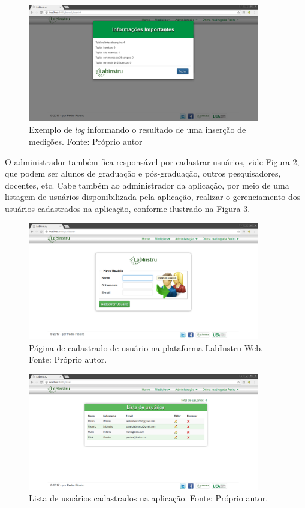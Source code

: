 \begin{figure}[h!]
	\centering
	\includegraphics[width=0.9\textwidth]{./img/ap13.png}
	\caption{Exemplo de \emph{log} informando o resultado de uma inserção de medições. Fonte: Próprio autor} \label{fig:ap13}
\end{figure}



O administrador também fica responsável por cadastrar usuários, vide Figura \ref{fig:ap4}, que podem ser alunos de graduação e pós-graduação, outros pesquisadores, docentes, etc. Cabe também ao administrador da aplicação, por meio de uma listagem de usuários disponibilizada pela aplicação, realizar o gerenciamento dos usuários cadastrados na aplicação, conforme ilustrado na Figura \ref{fig:ap14}.

\begin{figure}[h!]
	\centering
	\includegraphics[width=0.9\textwidth]{./img/ap4.png}
	\caption{Página de cadastrado de usuário na plataforma LabInstru Web. Fonte: Próprio autor.} \label{fig:ap4}
\end{figure}

\begin{figure}[h!]
	\centering
	\includegraphics[width=0.9\textwidth]{./img/ap14.png}
	\caption{Lista de usuários cadastrados na aplicação. Fonte: Próprio autor.} \label{fig:ap14}
\end{figure}

